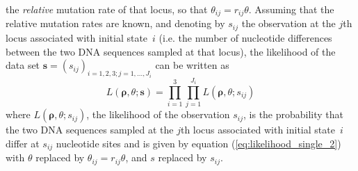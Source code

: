 \documentclass[11pt]{article}
\begin{document}
the \textit{relative} mutation rate of that locus, so that $\theta_{ij}=r_{ij}\theta$. 
Assuming that the relative mutation rates are known, and denoting by $s_{ij}$ the observation at the $j$th locus associated with initial state~$i$ (i.e. the number of nucleotide differences between the two DNA sequences sampled at that locus), the likelihood of the data set $\boldsymbol{s}=(s_{ij})_{i=1,2,3; j=1,\ldots,J_i}$ can be written as
\begin{equation*}
\label{eq:estimated likelihood}
\displaystyle 
L\left(\boldsymbol{\rho},\theta;\mathbf{s}\right)=\prod_{i=1}^3 \prod_{j=1}^{J_i} L(\boldsymbol{\rho},\theta;s_{ij})
\end{equation*}
where $L(\boldsymbol{\rho},\theta;s_{ij})$, 
the likelihood of the observation $s_{ij}$, is the probability that the two DNA sequences sampled at the $j$th locus associated with initial state~$i$ differ at $s_{ij}$ nucleotide sites and is given by 
equation (\ref{eq:likelihood_single_2}) with  $\theta$ replaced by $\theta_{ij}=r_{ij}\theta$, and $s$ replaced by $s_{ij}$.
\end{document}
